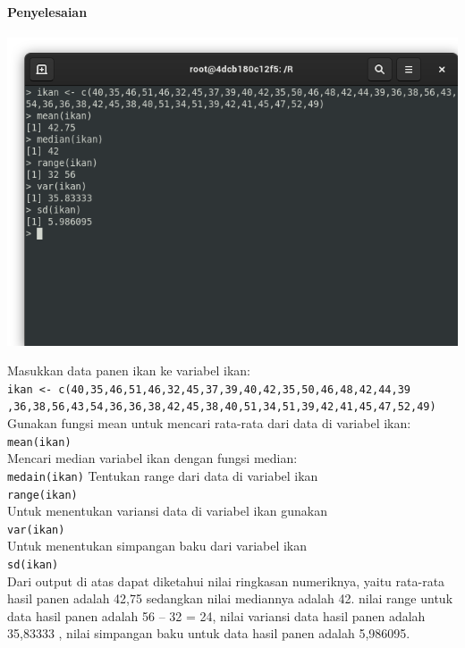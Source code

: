 \documentclass[a4paper,12pt]{article}
\begin{document}
\paragraph{Penyelesaian}
\begin{center}
\includegraphics[scale=.6]{latihan01}
\end{center}
Masukkan data panen ikan ke variabel ikan:\\
\texttt{ikan <- c(40,35,46,51,46,32,45,37,39,40,42,35,50,46,48,42,44,39
	\\,36,38,56,43,54,36,36,38,42,45,38,40,51,34,51,39,42,41,45,47,52,49)}\\
Gunakan fungsi mean untuk mencari rata-rata dari data di variabel ikan:\\
\texttt{mean(ikan)}\\
Mencari median variabel ikan dengan fungsi median:\\
\texttt{medain(ikan)}
Tentukan range dari data di variabel ikan\\
\texttt{range(ikan)}\\
Untuk menentukan variansi data di variabel ikan gunakan\\
\texttt{var(ikan)}\\
Untuk menentukan simpangan baku dari variabel ikan\\
\texttt{sd(ikan)}\\
Dari output di atas dapat diketahui nilai ringkasan numeriknya, yaitu rata-rata hasil panen adalah 42,75 sedangkan nilai mediannya adalah 42. nilai range untuk data hasil panen adalah 56 – 32 = 24, nilai variansi data hasil panen adalah  35,83333 , nilai simpangan baku untuk data hasil panen adalah 5,986095.\\
\end{document}
